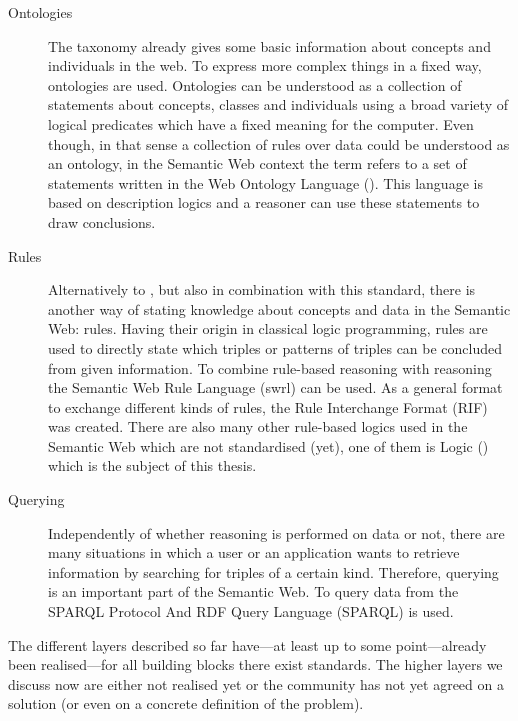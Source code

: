 \begin{description}
{ } 
 \item[Ontologies]
 The taxonomy already gives some basic information about concepts and individuals in the web. To express more complex things in a fixed way, ontologies are used. 
 Ontologies can be understood as a collection of statements about concepts, classes and individuals using a broad variety of logical predicates which have a fixed meaning for the computer.
 Even though, in that sense a collection of rules over \rdf data could be understood as an ontology,  in the Semantic Web context the term refers to a set of statements written in the Web 
 Ontology Language (\owl). This language is based on description logics and a reasoner can use these statements to draw conclusions.
 \item[Rules] Alternatively to \owl, but also in combination with this standard, there is another way of stating knowledge about concepts and data in the Semantic Web: rules. 
 Having their origin in classical logic programming, rules are used to directly state which triples or patterns of triples can be concluded from given information. To combine rule-based reasoning 
 with \owl reasoning the Semantic Web Rule Language (swrl) can be used. As a general format to exchange different kinds of rules, the Rule Interchange Format (RIF) was created. 
 There are also many other 
 rule-based logics used in the Semantic Web which are not standardised (yet), one of them is \notationthree Logic (\nthreelogic) 
 which is the subject of this thesis.
 \item[Querying] Independently of whether reasoning is performed on \rdf data or not, there are many situations in which a user or an application wants to retrieve information 
 by searching for triples of a certain kind. Therefore, querying is an important part of the Semantic Web. To query data from \rdf the SPARQL Protocol And RDF Query Language (SPARQL) is used.
 \end{description}
 The different layers described so far have---at least up to some point---already been realised---for all building blocks there exist standards. 
 The higher layers we discuss now
are either not realised yet or the community has not yet agreed on a solution (or even on a concrete definition of the problem). 
